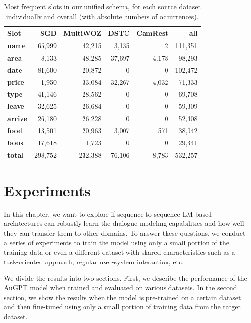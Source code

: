 \begin{table}[tp]
    \centering\footnotesize
    \begin{tabular}{l>{\hspace{-2mm}}rrrrr}
        \toprule
        \bf Slot &
        \textbf{SGD} & 
        \textbf{MultiWOZ} &
        \textbf{DSTC} &
        \textbf{CamRest} &
         \textbf{all}\\ \midrule
        \textbf{name} & 65,999 & 42,215 & 3,135 & 2 & 111,351\\ 
        \textbf{area} & 8,133 & 48,285 & 37,697 & 4,178 & 98,293 \\ 
        \textbf{date} & 81,600 & 20,872 & 0 & 0 & 102,472\\
        \textbf{price} & 1,950 & 33,084 & 32,267 & 4,032 & 71,333\\
        \textbf{type}& 41,146 & 28,562 & 0 & 0 & 69,708\\
        \textbf{leave}& 32,625 & 26,684 & 0 & 0 & 59,309\\
        \textbf{arrive}& 26,180 & 26,228 & 0 & 0 & 52,408\\
        \textbf{food}& 13,501 & 20,963 & 3,007 & 571 & 38,042\\
        \textbf{book}& 17,618 & 11,723 & 0 & 0 & 29,341\\
        \midrule
        \textbf{total}& 298,752 & 232,388 & 76,106 & 8,783 & 532,257\\
        \bottomrule
    \end{tabular}
    \caption{Most frequent slots in our unified schema, for each source dataset individually and overall (with absolute numbers of occurrences).}
    \label{tab:slots}
\end{table}

\section{Experiments}
\label{06:expe}

In this chapter, we want to explore if sequence-to-sequence LM-based architectures can robustly learn the dialogue modeling capabilities and how well they can transfer them to other domains.
To answer these questions, we conduct a series of experiments to train the model using only a small portion of the training data or even a different dataset with shared characteristics such as a task-oriented approach, regular user-system interaction, etc.

We divide the results into two sections.
First, we describe the performance of the AuGPT model when trained and evaluated on various datasets.
In the second section, we show the results when the model is pre-trained on a certain dataset and then fine-tuned using only a small portion of training data from the target dataset.

